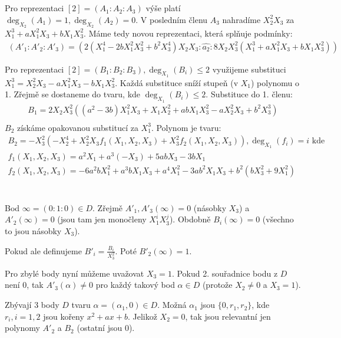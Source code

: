 \documentclass[12pt, a4paper]{article}
\begin{document}
\section{}
Pro reprezentaci $[2] = (A_1 : A_2 : A_3)$ výše platí $\deg_{X_2}(A_1) = 1, \deg_{X_2}(A_2) = 0$. V posledním členu $A_3$ nahradíme $X_2^2X_3$ za $X_1^3+aX_1^2X_3+bX_1X_3^2$. Máme tedy novou reprezentaci, která splňuje podmínky:
\begin{gather*}
(A'_1 : A'_2 : A'_3) = (2(X_1^4-2bX_1^2X_3^2 + b^2X_3^4)X_2X_3 : \widehat{a_2} : 8X_2X_3^2(X_1^3+aX_1^2X_3+bX_1X_3^2))
\end{gather*}

Pro reprezentaci $[2] = (B_1 : B_2 : B_3), \deg_{X_1}(B_i)\leq 2$ využijeme substituci $X_1^3 = X_2^2X_3-aX_1^2X_3-bX_1X_3^2$. Každá substituce sníží stupeň (v $X_1$) polynomu o 1. Zřejmě se dostaneme do tvaru, kde $\deg_{X_1}(B_i)\leq 2$. Substituce do 1. členu:
\begin{gather*}
B_1 = 2X_2X_3^2((a^2-3b)X_1^2X_3+X_1X_2^2+abX_1X_3^2-aX_2^2X_3+b^2X_3^3)\\
\end{gather*}
$B_2$ získáme opakovanou substitucí za $X_1^3$. Polynom je tvaru:
\begin{gather*}
B_2 = -X_3^2(-X_2^4+X_2^2X_3f_1(X_1,X_2,X_3) + X_3^2f_2(X_1,X_2,X_3)), \deg_{X_1}(f_i) = i \text{ kde }\\
f_1(X_1,X_2,X_3) = a^2 X_1 +a^3 (-X_3)+5 a b X_3-3 b X_1\\
f_2(X_1,X_2,X_3) = -6 a^2 b X_1^2+a^3 b X_1 X_3+a^4 X_1^2-3 a b^2 X_1 X_3+b^2 \left(b X_3^2+9 X_1^2\right)
\end{gather*}

\section{}
Bod $\infty = (0:1:0) \in D$. Zřejmě $A'_1,A'_3(\infty) = 0$ (násobky $X_3$) a $A'_2(\infty) = 0$ (jsou tam jen monočleny $X_1^iX_3^j$). Obdobně $B_i(\infty)=0$ (všechno to jsou násobky $X_3$).

Pokud ale definujeme $B'_i = \frac{B_i}{X_3^2}$. Poté $B'_2(\infty) = 1$.

Pro zbylé body nyní můžeme uvažovat $X_3 = 1$. Pokud 2. souřadnice bodu z $D$ není 0, tak $A'_3(\alpha) \neq 0$ pro každý takový bod $\alpha \in D$ (protože $X_2 \neq 0$ a $X_3 = 1$).

Zbývají 3 body $D$ tvaru $\alpha = (\alpha_1, 0) \in D$. Možná $\alpha_1$ jsou $\{0, r_1, r_2\}$, kde $r_i, i=1,2$ jsou kořeny $x^2+ax+b$. Jelikož $X_2=0$, tak jsou relevantní jen polynomy $A'_2$ a $B_2$ (ostatní jsou $0$).
\end{document}
